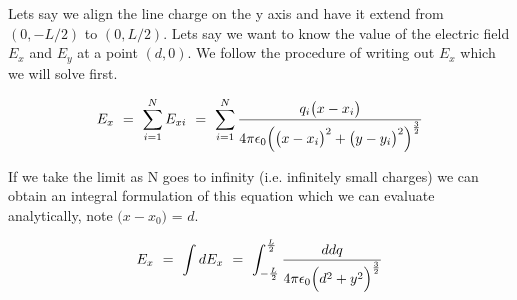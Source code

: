 \documentclass{article}
\begin{document}
Lets say we align the line charge on the y axis and have it extend from \begin{math} (0, -L/2) \end{math} to \begin{math} (0, L/2) \end{math}. Lets say we want to know the value of the electric field \begin{math} E_{x} \end{math} and \begin{math} E_{y}\end{math} at a point \begin{math} (d, 0) \end{math}. We follow the procedure of writing out \begin{math} E_{x} \end{math} which we will solve first. 

\begin{equation} \label{eb-eq-31-1}
E_x \hspace{0.125cm} = \hspace{0.125cm} \sum_{i=1}^{N} E_{xi} \hspace{0.125cm} = \hspace{0.125cm} \sum_{i=1}^{N} \frac{q_{i}\big(x - x_{i}\big)}{4\pi \epsilon_{0} \Big( \big(x - x_{i}\big)^2 + \big(y - y_{i}\big)^2 \Big)^{\frac{3}{2}}}
\end{equation}

If we take the limit as N goes to infinity (i.e. infinitely small charges) we can obtain an integral formulation of this equation which we can evaluate analytically, note \begin{math} \big(x - x_0\big) \end{math} =  \begin{math} d \end{math}. 

\begin{equation} \label{eb-eq-32-1}
E_x \hspace{0.125cm} = \hspace{0.125cm} \int dE_{x} \hspace{0.125cm} = \hspace{0.125cm} \int_{-\frac{L}{2}}^{\frac{L}{2}} \frac{d dq }{4\pi \epsilon_{0} \Big( d^2 + y^2 \Big)^{\frac{3}{2}}}
\end{equation}
\end{document}
